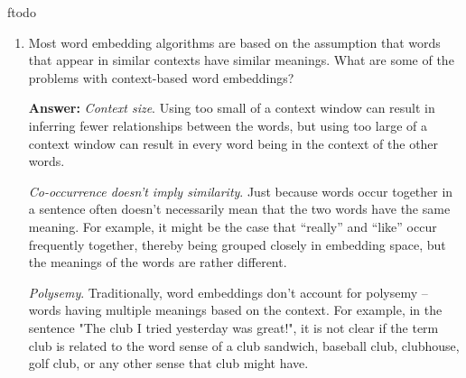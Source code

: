 ƒtodo\documentclass{article}
\newenvironment{QandA}{\begin{enumerate}[label=\arabic*.]}{\end{enumerate}}
\newenvironment{InnerQandA}{\begin{enumerate}[label=\roman*.]}{\end{enumerate}}
\newenvironment{answer}{\par\normalfont \textbf{Answer:}}{}
\begin{document}
\begin{QandA}
\begin{InnerQandA}
        \item Most word embedding algorithms are based on the assumption that words that appear in similar contexts have similar meanings. What are some of the problems with context-based word embeddings?
        \begin{answer}
            \textit{Context size}. Using too small of a context window can result in inferring fewer relationships between the words, but using too large of a context window can result in every word being in the context of the other words. 

            \textit{Co-occurrence doesn't imply similarity}. Just because words occur together in a sentence often doesn't necessarily mean that the two words have the same meaning. For example, it might be the case that ``really'' and ``like'' occur frequently together, thereby being grouped closely in embedding space, but the meanings of the words are rather different. 

            \textit{Polysemy}. Traditionally, word embeddings don't account for polysemy -- words having multiple meanings based on the context. For example, in the sentence "The club I tried yesterday was great!", it is not clear if the term club is related to the word sense of a club sandwich, baseball club, clubhouse, golf club, or any other sense that club might have. 
        \end{answer}
    \end{InnerQandA}


\end{QandA}
\end{document}
